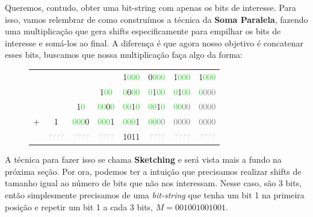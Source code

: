 Queremos, contudo, obter uma bit-string com apenas os bits de interesse. Para
isso, vamos relembrar de como construímos a técnica da \textbf{Soma Paralela},
fazendo uma multiplicação que gera shifts especificamente para empilhar os bits
de interesse e somá-los ao final. A diferença é que agora nosso objetivo é
concatenar esses bits, buscamos que nossa multiplicação faça algo da forma:

\begin{figure}[h]
\bf \Large \centering
\begin{tabular}{cccccccc}
& & & & \textcolor{PineGreen}{1}\textcolor{LimeGreen}{000} &
\textcolor{PineGreen}{0}\textcolor{LimeGreen}{000} &
\textcolor{PineGreen}{1}\textcolor{LimeGreen}{000} &
\textcolor{PineGreen}{1}\textcolor{LimeGreen}{000} \\
& & & \textcolor{PineGreen}{\phantom{0}1}\textcolor{LimeGreen}{00} & 
\textcolor{LimeGreen}{0}\textcolor{PineGreen}{0}\textcolor{LimeGreen}{00} &
\textcolor{LimeGreen}{0}\textcolor{PineGreen}{1}\textcolor{LimeGreen}{00} &
\textcolor{LimeGreen}{0}\textcolor{PineGreen}{1}\textcolor{LimeGreen}{00} &
\textcolor{LimeGreen}{0}\textcolor{gray}{000} \\
& & \textcolor{PineGreen}{\phantom{00}1}\textcolor{LimeGreen}{0} &
\textcolor{LimeGreen}{00}\textcolor{PineGreen}{0}\textcolor{LimeGreen}{0}  &
\textcolor{LimeGreen}{00}\textcolor{PineGreen}{1}\textcolor{LimeGreen}{0}  &
\textcolor{LimeGreen}{00}\textcolor{PineGreen}{1}\textcolor{LimeGreen}{0}  &
\textcolor{LimeGreen}{00}\textcolor{gray}{00} &
\textcolor{gray}{0000} \\
$+$ & \textcolor{PineGreen}{\phantom{000}1} &
\textcolor{LimeGreen}{000}\textcolor{PineGreen}{0} &
\textcolor{LimeGreen}{000}\textcolor{PineGreen}{1} &
\textcolor{LimeGreen}{000}\textcolor{PineGreen}{1} &
\textcolor{LimeGreen}{000}\textcolor{gray}{0} &
\textcolor{gray}{0000} &
\textcolor{gray}{0000} \\
\hline
& \textcolor{lightgray}{????} &
\textcolor{lightgray}{????} & 
\textcolor{lightgray}{????} & 
\textcolor{PineGreen}{1011} & 
\textcolor{lightgray}{????} &
\textcolor{lightgray}{????} & 
\textcolor{lightgray}{????}
\end{tabular}
\end{figure}

A técnica para fazer isso se chama \textbf{Sketching} e será vista mais a fundo
na próxima seção. Por ora, podemos ter a intuição que precisamos realizar shifts
de tamanho igual ao número de bits que não nos interessam. Nesse caso, são 3
bits, então simplesmente precisamos de uma \textit{bit-string} que tenha um bit
1 na primeira posição e repetir um bit 1 a cada 3 bits, $M=001001001001$.

